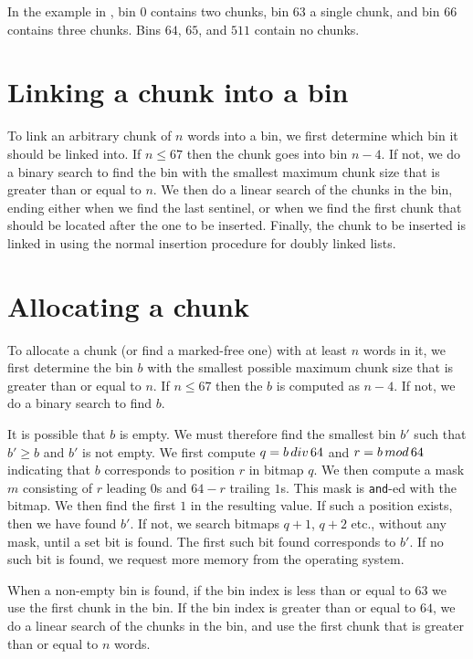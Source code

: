 In the example in , bin $0$ contains two chunks, bin
$63$ a single chunk, and bin $66$ contains three chunks.  Bins $64$,
$65$, and $511$ contain no chunks.

\section{Linking a chunk into a bin}

To link an arbitrary chunk of $n$ words into a bin, we first determine
which bin it should be linked into.  If $n \le 67$ then the chunk goes
into bin $n-4$.  If not, we do a binary search to find the bin with
the smallest maximum chunk size that is greater than or equal to $n$.
We then do a linear search of the chunks in the bin, ending either
when we find the last sentinel, or when we find the first chunk that
should be located after the one to be inserted.  Finally, the chunk to
be inserted is linked in using the normal insertion procedure for
doubly linked lists.


\section{Allocating a chunk}

To allocate a chunk (or find a marked-free one)
with at least $n$ words in it, we first determine
the bin $b$ with the smallest possible maximum chunk size that is
greater than or equal to $n$.  If $n \le 67$ then the $b$ is computed
as $n-4$.  If not, we do a binary search to find $b$.

It is possible that $b$ is empty.  We must therefore find the smallest
bin $b'$ such that $b' \ge b$ and $b'$ is not empty.  We first compute
$q = b \thinspace div \thinspace 64$ and $r = b \thinspace
mod \thinspace 64$ indicating that $b$ corresponds to position $r$ in
bitmap $q$.  We then compute a mask $m$ consisting of $r$ leading $0$s
and $64-r$ trailing $1$s.  This mask is \texttt{and}-ed with the bitmap.  We
then find the first $1$ in the resulting value.  If such a position
exists, then we have found $b'$.  If not, we search bitmaps $q+1$,
$q+2$ etc., without any mask, until a set bit is found.  The first
such bit found corresponds to $b'$.  If no such bit is found, we
request more memory from the operating system.

When a non-empty bin is found, if the bin index is less than or equal
to $63$ we use the first chunk in the bin.  If the bin index is
greater than or equal to $64$, we do a linear search of the chunks in
the bin, and use the first chunk that is greater than or equal to $n$
words.

